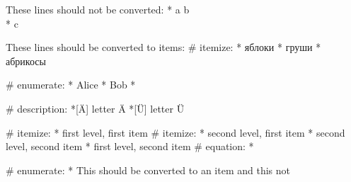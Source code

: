 These lines should not be converted:
* a
\* b
\\* c


These lines should be converted to items:
# itemize:
  * яблоки
  * груши
  * абрикосы

# enumerate:
  * Alice
  * Bob
  *

# description:
  *[Ä] letter Ä
  *[Ü] letter Ü


# itemize:
  * first level, first item
    # itemize:
      * second level, first item
      * second level, second item
  * first level, second item
    # equation:
      * %


# enumerate:
  * This should be converted to an item
  \* and this not
